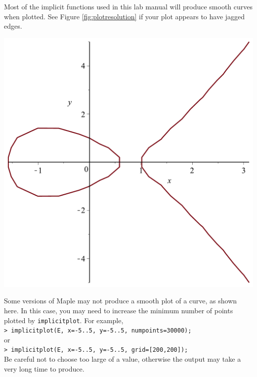 \begin{maplegroup}
\begin{mapleinput}
\end{mapleinput}
\end{maplegroup}

\begin{maplegroup}
\begin{mapleinput}
\end{mapleinput}
\mapleresult
{}
\end{maplegroup}

Most of the implicit functions used in this lab manual will produce smooth curves when plotted. See Figure \ref{fig:plotresolution} if your plot appears to have jagged edges.
\begin{marginfigure}
\centering
\includegraphics[scale=0.25]{tutorials/figures/Implicit_Functions_and_Graphsplot2d1-eps-converted-to.pdf}
\caption{Some versions of Maple may not produce a smooth plot of a curve, as shown here. In this case, you may need to increase the minimum number of points plotted by \texttt{implicitplot}. For example,\\
\texttt{> implicitplot(E, x=-5..5, y=-5..5, numpoints=30000);} \\
or \\
\texttt{> implicitplot(E, x=-5..5, y=-5..5, grid=[200,200]);} \\
Be careful not to choose too large of a value, otherwise the output may take a very long time to produce.}
\label{fig:plotresolution}
\end{marginfigure}

